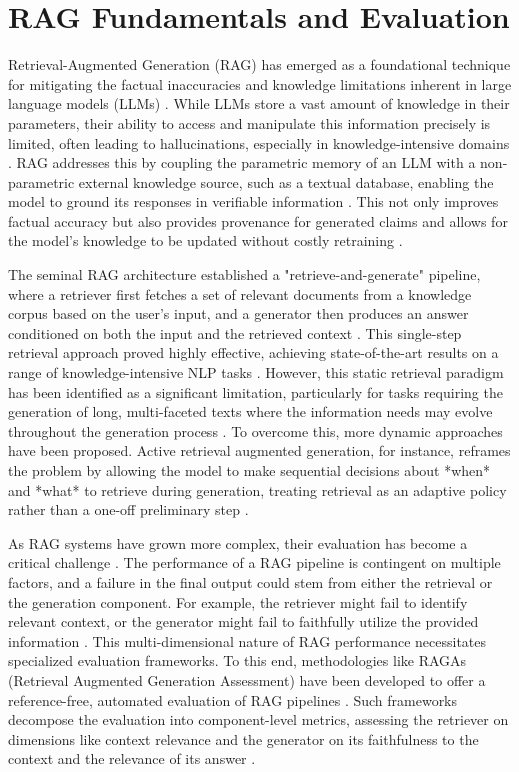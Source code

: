 \documentclass[11pt]{article}
\begin{document}
\section{RAG Fundamentals and Evaluation}
Retrieval-Augmented Generation (RAG) has emerged as a foundational technique for mitigating the factual inaccuracies and knowledge limitations inherent in large language models (LLMs) . While LLMs store a vast amount of knowledge in their parameters, their ability to access and manipulate this information precisely is limited, often leading to hallucinations, especially in knowledge-intensive domains \cite{ref1}. RAG addresses this by coupling the parametric memory of an LLM with a non-parametric external knowledge source, such as a textual database, enabling the model to ground its responses in verifiable information . This not only improves factual accuracy but also provides provenance for generated claims and allows for the model's knowledge to be updated without costly retraining \cite{ref1}.

The seminal RAG architecture established a "retrieve-and-generate" pipeline, where a retriever first fetches a set of relevant documents from a knowledge corpus based on the user's input, and a generator then produces an answer conditioned on both the input and the retrieved context \cite{ref1}. This single-step retrieval approach proved highly effective, achieving state-of-the-art results on a range of knowledge-intensive NLP tasks \cite{ref1}. However, this static retrieval paradigm has been identified as a significant limitation, particularly for tasks requiring the generation of long, multi-faceted texts where the information needs may evolve throughout the generation process \cite{ref3}. To overcome this, more dynamic approaches have been proposed. Active retrieval augmented generation, for instance, reframes the problem by allowing the model to make sequential decisions about *when* and *what* to retrieve during generation, treating retrieval as an adaptive policy rather than a one-off preliminary step \cite{ref3}.

As RAG systems have grown more complex, their evaluation has become a critical challenge \cite{ref5}. The performance of a RAG pipeline is contingent on multiple factors, and a failure in the final output could stem from either the retrieval or the generation component. For example, the retriever might fail to identify relevant context, or the generator might fail to faithfully utilize the provided information \cite{ref5}. This multi-dimensional nature of RAG performance necessitates specialized evaluation frameworks. To this end, methodologies like RAGAs (Retrieval Augmented Generation Assessment) have been developed to offer a reference-free, automated evaluation of RAG pipelines \cite{ref5}. Such frameworks decompose the evaluation into component-level metrics, assessing the retriever on dimensions like context relevance and the generator on its faithfulness to the context and the relevance of its answer \cite{ref5}.
\end{document}
